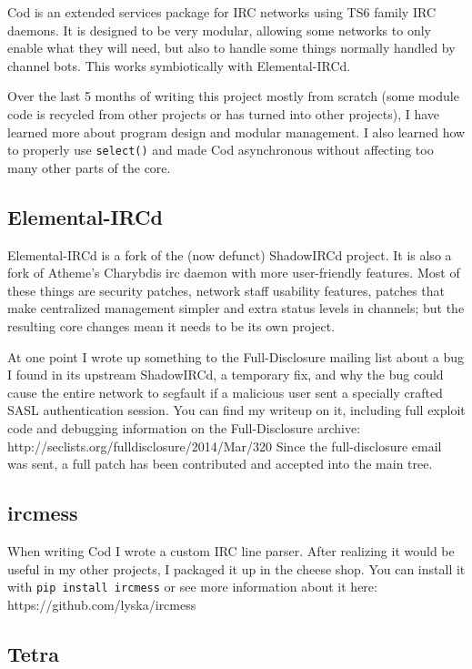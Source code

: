 \documentclass[twocolumn]{article}
\begin{document}
Cod is an extended services package for IRC networks using TS6 family IRC daemons. It is designed to be very modular, allowing some networks to only enable what they will need, but also to handle some things normally handled by channel bots. This works symbiotically with Elemental-IRCd.

Over the last 5 months of writing this project mostly from scratch (some module code is recycled from other projects or has turned into other projects), I have learned more about program design and modular management. I also learned how to properly use \texttt{select()} and made Cod asynchronous without affecting too many other parts of the core.

\subsection{Elemental-IRCd}

Elemental-IRCd is a fork of the (now defunct) ShadowIRCd project. It is also a fork of Atheme's Charybdis irc daemon with more user-friendly features. Most of these things are security patches, network staff usability features, patches that make centralized management simpler and extra status levels in channels; but the resulting core changes mean it needs to be its own project.

At one point I wrote up something to the Full-Disclosure mailing list about a bug I found in its upstream ShadowIRCd, a temporary fix, and why the bug could cause the entire network to segfault if a malicious user sent a specially crafted SASL authentication session. You can find my writeup on it, including full exploit code and debugging information on the Full-Disclosure archive: http://seclists.org/fulldisclosure/2014/Mar/320 Since the full-disclosure email was sent, a full patch has been contributed and accepted into the main tree.

\subsection{ircmess}

When writing Cod I wrote a custom IRC line parser. After realizing it would be useful in my other projects, I packaged it up in the cheese shop. You can install it with \texttt{pip install ircmess} or see more information about it here: https://github.com/lyska/ircmess

\subsection{Tetra}
\end{document}
